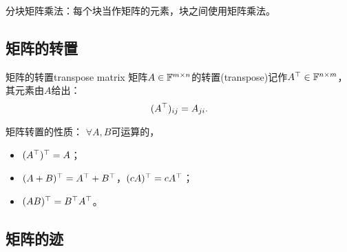 \begin{remark}
	分块矩阵乘法：每个块当作矩阵的元素，块之间使用矩阵乘法。
\end{remark}

\subsection{矩阵的转置}

\begin{definition}{矩阵的转置}{transpose matrix}
	矩阵$A\in\mathbb F^{m\times n}$的转置(transpose)记作$A^\top\in\mathbb F^{n\times m}$，其元素由$A$给出：
	\[
		(A^\top)_{ij}=A_{ji}.
	\]
\end{definition}
\begin{corollary}
	矩阵转置的性质：%
	$\forall A,B$可运算的，
	\begin{itemize}
		\item $(A^\top)^\top=A$；
		\item $(A+B)^\top=A^\top+B^\top$，$(cA)^\top=cA^\top$；
		\item $(AB)^\top=B^\top A^\top$。
	\end{itemize}
\end{corollary}

\subsection{矩阵的迹}

